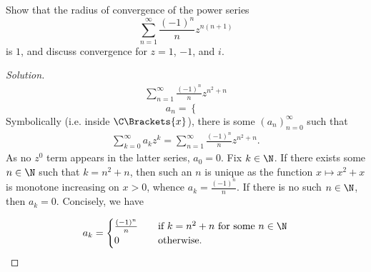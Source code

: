 \documentclass[12pt]{article}
\begin{document}
\begin{homeworkProblem}
 Show that the radius of convergence of the power series 
 \[
   \sum_{n=1}^{\infty}\frac{(-1)^{n}}{n} z^{n(n+1)}
 \]
 is $ 1 $, and discuss convergence for $ z= 1 $, $ -1 $, and $ i $.

\begin{proof}[Solution]
  \begin{align*}
    \sum_{n=1}^{\infty} \frac{(-1)^{n}}{n} z^{n^{2}+n}
  \end{align*}  
  \[
    a_{n}= \begin{cases}\end{cases}
  \] 
  Symbolically (i.e. inside $\C\Brackets{x}$), there is some $ (a_{n})_{n=0}^{\infty} $ such that 
  \begin{align*}
    \sum_{k=0}^{\infty} a_{k}z^{k} = \sum_{n=1}^{\infty} \frac{(-1)^{n}}{n} z^{n^{2}+n}.
  \end{align*}
  As no $ z^{0} $ term appears in the latter series, $ a_{0}= 0 $. Fix $ k\in \N $. If there exists some $ n\in \N $ such that $ k = n^{2}+n $, then such an $ n $ is unique as the function $ x\mapsto x^{2}+x $ is monotone increasing on $ x>0 $, whence $ a_{k} = \frac{(-1)^{n}}{n} $. If there is no such $ n\in \N $, then $ a_{k} = 0 $. Concisely, we have 

  \[
    a_{k} = \begin{cases}
      \frac{(-1)^{n}}{n} &\quad \text{if $ k = n^{2}+n $ for some $ n\in \N $}\\
        0 &\quad \text{otherwise}.
    \end{cases}
  \]


\end{proof}
\end{homeworkProblem}
\end{document}
